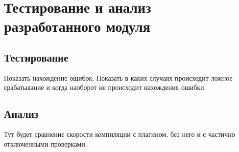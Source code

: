 \chapter{Тестирование и анализ разработанного модуля}

\section{Тестирование}
Показать нахождение ошибок. Показать в каких случаях происходит ложное срабатывание и когда
наоборот не происходит нахождения ошибки.

\section{Анализ}

Тут будет сравнение скорости компиляции с плагином, без него и с частично отключенными проверками.